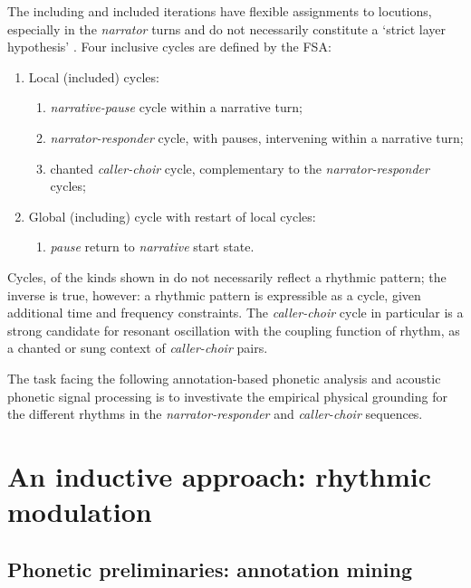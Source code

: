 \documentclass[output=paper,colorlinks,citecolor=brown]{langscibook}
\begin{document}
The including and included iterations have flexible assignments to locutions, especially in the \textit{narrator} turns and do not necessarily constitute a `strict layer hypothesis' \citep{selkirk1984}. Four inclusive cycles are defined by the FSA:

\begin{enumerate} %
\item Local (included) cycles:
	\begin{enumerate} \itemsep -5pt
	\item[] \textit{narrative-pause} cycle within a narrative turn;
	\item[] \textit{narrator-responder} cycle, with pauses, intervening within a narrative turn;
	\item[] chanted \textit{caller-choir} cycle, complementary to the \textit{narrator-responder} cycles;
	\end{enumerate}
\item Global (including) cycle with restart of local cycles:
	\begin{enumerate} %
	\item[] \textit{pause} return to \textit{narrative} start state.
	\end{enumerate}
\end{enumerate}

Cycles, of the kinds shown in  do not necessarily reflect a rhythmic pattern; the inverse is true, however: a rhythmic pattern is expressible as a cycle, given additional time and frequency constraints. The \textit{caller-choir} cycle in particular is a strong candidate for resonant oscillation with the coupling function of rhythm, as a chanted or sung context of \textit{caller-choir} pairs.

The task facing the following annotation-based phonetic analysis and acoustic phonetic signal processing is to investivate the empirical physical grounding for the different rhythms in the \textit{narrator-responder} and \textit{caller-choir} sequences.


\section{An inductive approach: rhythmic modulation}

\subsection{Phonetic preliminaries: annotation mining}
\end{document}
